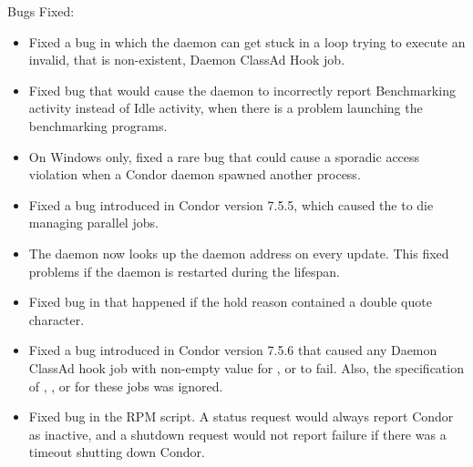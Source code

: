 \noindent Bugs Fixed:

\begin{itemize}

\item Fixed a bug in which the  daemon can get stuck in a
loop trying to execute an invalid, 
that is non-existent, Daemon ClassAd Hook job.

\item Fixed bug that would cause the  daemon to incorrectly
report Benchmarking activity instead of Idle activity,
when there is a problem launching the benchmarking programs.

\item On Windows only, fixed a rare bug that could cause
a sporadic access violation when a Condor daemon spawned another process.

\item Fixed a bug introduced in Condor version 7.5.5,
which caused the  to die managing parallel jobs.


\item The  daemon now looks up the  daemon address
on every update.  
This fixed problems if the  daemon is restarted 
during the  lifespan.

\item Fixed bug in  that happened if the hold
reason contained a double quote character.

\item Fixed a bug introduced in Condor version 7.5.6 that
caused any Daemon ClassAd hook job with non-empty value for
,
or  to fail.
Also, the specification of 
,
,
or  for these jobs was ignored.

\item Fixed bug in the RPM  script. 
A status request would always report Condor as inactive, 
and a shutdown request would not report failure if there was a
timeout shutting down Condor.


\end{itemize}
